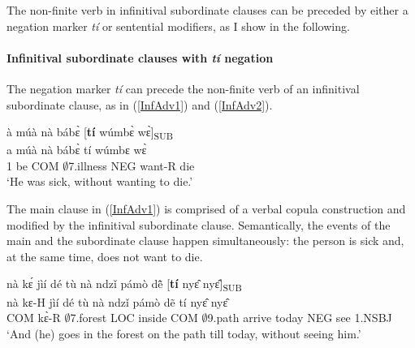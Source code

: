 The non-finite verb in infinitival subordinate clauses can be preceded by either a negation marker {\itshape tí} or sentential modifiers, as I show in the following.

\paragraph{Infinitival subordinate clauses with {\itshape tí} negation}
The negation marker {\itshape tí} can precede the non-finite verb of an infinitival subordinate clause, as in (\ref{InfAdv1}) and (\ref{InfAdv2}).


\begin{exe} 
\ex\label{InfAdv1} 
  \glll  à múà nà bábɛ̀ [{\bfseries tí} wúmbɛ̀ wɛ̀]\textsubscript{SUB} \\
          a múà nà bábɛ̀ tí wúmbɛ wɛ̀   \\
         1 be COM $\emptyset$7.illness NEG want-R die \\
    \trans `He was sick, without wanting to die.'
\end{exe}

\noindent The main clause in (\ref{InfAdv1}) is comprised of a verbal copula construction and modified by the infinitival subordinate clause. Semantically, the events of the main and the subordinate clause happen simultaneously: the person is sick and, at the same time, does not want to die. 


\begin{exe} 
\ex\label{InfAdv2}
  \glll    nà kɛ́ jìí dé tù nà ndzǐ pámò dẽ̂ [{\bfseries tí} nyɛ̂ nyɛ̂]\textsubscript{SUB} \\
          nà kɛ-H jìí dé tù nà ndzǐ pámò dẽ  tí nyɛ̂ nyɛ̂ \\
         COM kɛ̀-R $\emptyset$7.forest LOC inside COM $\emptyset$9.path arrive today NEG see 1.NSBJ \\
    \trans `And (he) goes in the forest on the path till today, without seeing him.'
\end{exe}


